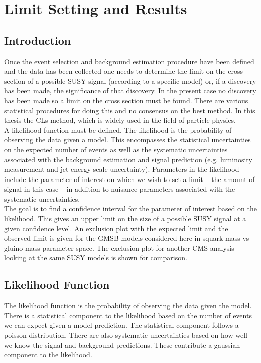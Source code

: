 \chapter{Limit Setting and Results}

\section{Introduction}

Once the event selection and background estimation procedure have been defined
and the data has been collected one needs to determine the limit on the cross
section of a possible SUSY signal (according to a specific model) or, if a 
discovery has been made, the significance of that discovery. In the present case 
no discovery has been made so a limit on the cross section must be found. There 
are various statistical procedures for doing this and no consensus on the best 
method. In this thesis the CLs method, which is widely used in the field of 
particle physics. \\

A likelihood function must be defined. The likelihood is the probability of 
observing the data given a model. This encompasses the statistical uncertainties
on the expected number of events as well as the systematic uncertainties 
associated with the background estimation and signal prediction (e.g. luminosity 
measurement and jet energy scale uncertainty). Parameters in the likelihood 
include the parameter of interest on which we wish to set a limit -- the amount
of signal in this case -- in addition to nuisance parameters associated with 
the systematic uncertainties. \\

The goal is to find a confidence interval for the parameter of interest based
on the likelihood. This gives an upper limit on the size of a possible SUSY 
signal at a given confidence level. An exclusion plot with the expected limit
and the observed limit is given for the GMSB models considered here in squark 
mass vs gluino mass parameter space. The exclusion plot for another CMS analysis
looking at the same SUSY models is shown for comparison.

\section{Likelihood Function}

The likelihood function is the probability of observing the data given the
model. There is a statistical component to the likelihood based on the number of
events we can expect given a model prediction. The statistical component follows
a poisson distribution. There are also systematic uncertainties based on how 
well we know the signal and background predictions. These contribute a gaussian
component to the likelihood. \\


